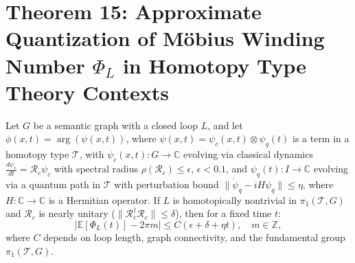 \documentclass[12pt]{article}
\begin{document}
\section*{Theorem 15: Approximate Quantization of Möbius Winding Number \(\Phi_L\) in Homotopy Type Theory Contexts}

\begin{theorem}
Let \(G\) be a semantic graph with a closed loop \(L\), and let \(\phi(x,t) = \arg(\psi(x,t))\), where \(\psi(x,t) = \psi_c(x,t) \otimes \psi_q(t)\) is a term in a homotopy type \(\mathcal{T}\), with \(\psi_c(x,t): G \to \mathbb{C}\) evolving via classical dynamics \(\frac{d\psi_c}{dt} = \mathcal{R}_c \psi_c\) with spectral radius \(\rho(\mathcal{R}_c) \leq \epsilon\), \(\epsilon < 0.1\), and \(\psi_q(t): I \to \mathbb{C}\) evolving via a quantum path in \(\mathcal{T}\) with perturbation bound \(\|\dot{\psi}_q - i H \psi_q\| \leq \eta\), where \(H: \mathbb{C} \to \mathbb{C}\) is a Hermitian operator. If \(L\) is homotopically nontrivial in \(\pi_1(\mathcal{T}, G)\) and \(\mathcal{R}_c\) is nearly unitary (\(\|\mathcal{R}_c^\dagger \mathcal{R}_c\| \leq \delta\)), then for a fixed time \(t\):
\[
\left| \mathbb{E}[\Phi_L(t)] - 2\pi m \right| \leq C (\epsilon + \delta + \eta t), \quad m \in \mathbb{Z},
\]
where \(C\) depends on loop length, graph connectivity, and the fundamental group \(\pi_1(\mathcal{T}, G)\).
\end{theorem}
\end{document}
